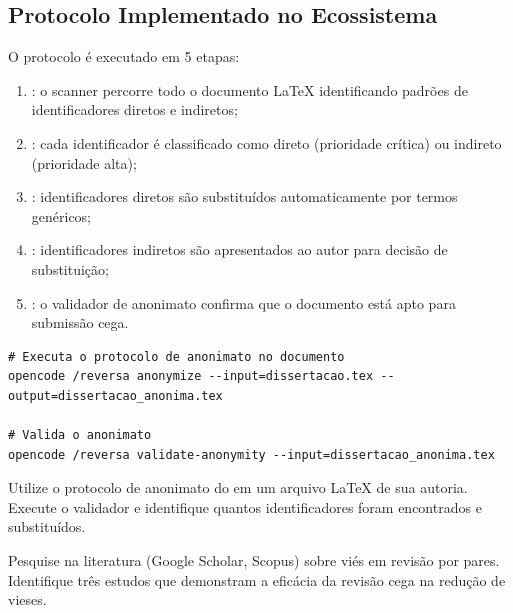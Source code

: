 \subsection{Protocolo Implementado no Ecossistema}

O protocolo é executado em 5 etapas:

\begin{enumerate}
\item {}: o scanner percorre todo o documento LaTeX
      identificando padrões de identificadores diretos e indiretos;
\item {}: cada identificador é classificado como direto
      (prioridade crítica) ou indireto (prioridade alta);
\item {}: identificadores diretos são
      substituídos automaticamente por termos genéricos;
\item {}: identificadores indiretos são
      apresentados ao autor para decisão de substituição;
\item {}: o validador de anonimato confirma que o
      documento está apto para submissão cega.
\end{enumerate}

\begin{lstlisting}[style=bashstyle, caption={Execucao do protocolo de anonimato}]
# Executa o protocolo de anonimato no documento
opencode /reversa anonymize --input=dissertacao.tex --output=dissertacao_anonima.tex

# Valida o anonimato
opencode /reversa validate-anonymity --input=dissertacao_anonima.tex
\end{lstlisting}

\begin{exercicio}
    Utilize o protocolo de anonimato do \opencodeeco{} em um arquivo LaTeX
    de sua autoria. Execute o validador e identifique quantos identificadores
    foram encontrados e substituídos.
\end{exercicio}

\begin{exercicio}
    Pesquise na literatura (Google Scholar, Scopus) sobre viés em revisão por
    pares. Identifique três estudos que demonstram a eficácia da revisão cega
    na redução de vieses.
\end{exercicio}

